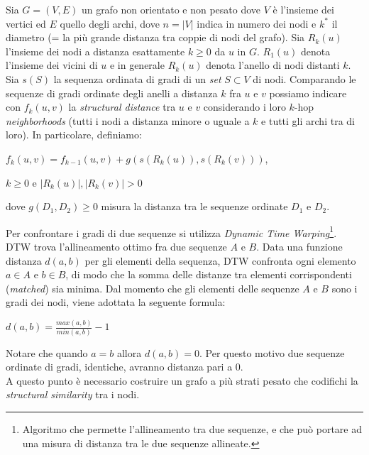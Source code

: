 \documentclass[11pt]{article}
\begin{document}
Sia $G = (V,E)$ un grafo non orientato e non pesato dove $V$ è l'insieme dei vertici ed $E$ quello degli archi, dove $n = |V|$ indica in numero dei nodi e $k^*$ il diametro (= la più grande distanza tra coppie di nodi del grafo). Sia $R_k(u)$ l'insieme dei nodi a distanza esattamente $k \geq 0$ da $u$ in $G$. $R_1(u)$ denota l'insieme dei vicini di $u$ e in generale $R_k(u)$ denota l'anello di nodi distanti $k$. Sia $s(S)$ la sequenza ordinata di gradi di un \textit{set} $S \subset V$ di nodi. Comparando le sequenze di gradi ordinate degli anelli a distanza $k$ fra $u$ e $v$ possiamo indicare con $f_k(u,v)$ la \textit{structural distance} tra $u$ e $v$ considerando i loro $k$-hop \textit{neighborhoods} (tutti i nodi a distanza minore o uguale a $k$ e tutti gli archi tra di loro). In particolare, definiamo:
\begin{center}
$f_k(u,v) = f_{k-1}(u,v) + g(s(R_k(u)),s(R_k(v)))$, 
\end{center}
\begin{center}
$k \geq 0$ e $|R_k(u)|, |R_k(v)| > 0$
\end{center}
dove $g(D_1,D_2) \geq 0$ misura la distanza tra le sequenze ordinate $D_1$ e $D_2$. 

Per confrontare i gradi di due sequenze si utilizza \textit{Dynamic Time Warping}\footnote{Algoritmo che permette l'allineamento tra due sequenze, e che può portare ad una misura di distanza tra le due sequenze allineate.}. DTW trova l'allineamento ottimo fra due sequenze $A$ e $B$. Data una funzione distanza $d(a,b)$ per gli elementi della sequenza, DTW confronta ogni elemento $a \in A$ e $b \in B$, di modo che la somma delle distanze tra elementi corrispondenti (\textit{matched}) sia minima. Dal momento che gli elementi delle sequenze $A$ e $B$ sono i gradi dei nodi, viene adottata la seguente formula:
\begin{center}
$d(a,b) = \displaystyle{\frac{max(a,b)}{min(a,b)}}-1$
\end{center}

Notare che quando $a = b$ allora $d(a,b) = 0$. Per questo motivo due sequenze ordinate di gradi, identiche, avranno distanza pari a 0.\\

A questo punto è necessario costruire un grafo a più strati pesato che codifichi la \textit{structural similarity} tra i nodi. 
\end{document}

